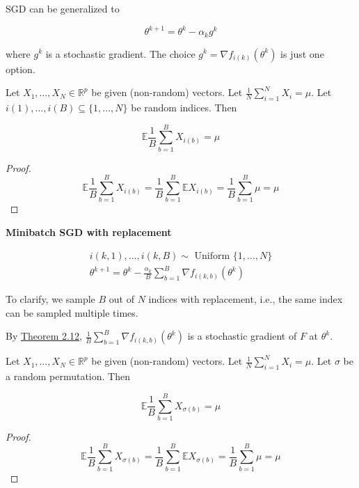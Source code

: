 \documentclass{report}
\begin{document}
SGD can be generalized to

$$
\theta^{k+1}=\theta^{k}-\alpha_{k} g^{k}
$$

where $g^{k}$ is a stochastic gradient. The choice $g^{k}=\nabla f_{i(k)}\left(\theta^{k}\right)$ is just one option.

\begin{theorem}
    Let $X_{1}, \ldots, X_{N} \in \mathbb{R}^{p}$ be given (non-random) vectors. Let $\frac{1}{N} \sum_{i=1}^{N} X_{i}=\mu$. Let $i(1), \ldots, i(B) \subseteq\{1, \ldots, N\}$ be random indices. Then

    $$
    \mathbb{E} \frac{1}{B} \sum_{b=1}^{B} X_{i(b)}=\mu
    $$

    \begin{proof}
        $$
        \mathbb{E} \frac{1}{B} \sum_{b=1}^{B} X_{i(b)}=\frac{1}{B} \sum_{b=1}^{B} \mathbb{E} X_{i(b)}=\frac{1}{B} \sum_{b=1}^{B} \mu=\mu
        $$
    \end{proof}
\end{theorem}

\begin{definition}
    \textbf{Minibatch SGD with replacement}

    $$
    \begin{gathered}
    i(k, 1), \ldots, i(k, B) \sim \text { Uniform }\{1, \ldots, N\} \\
    \theta^{k+1}=\theta^{k}-\frac{\alpha_{k}}{B} \sum_{b=1}^{B} \nabla f_{i(k, b)}\left(\theta^{k}\right)
    \end{gathered}
    $$

    To clarify, we sample $B$ out of $N$ indices with replacement, i.e., the same index can be sampled multiple times.

    By \hyperref[theorem:2.12]{Theorem 2.12}, $\frac{1}{B} \sum_{b=1}^{B} \nabla f_{i(k, b)}\left(\theta^{k}\right)$ is a stochastic gradient of $F$ at $\theta^{k}$.
\end{definition}

\begin{theorem}
    Let $X_{1}, \ldots, X_{N} \in \mathbb{R}^{p}$ be given (non-random) vectors. Let $\frac{1}{N} \sum_{i=1}^{N} X_{i}=\mu$. Let $\sigma$ be a random permutation. Then

    $$
    \mathbb{E} \frac{1}{B} \sum_{b=1}^{B} X_{\sigma(b)}=\mu
    $$

    \begin{proof}
        $$
        \mathbb{E} \frac{1}{B} \sum_{b=1}^{B} X_{\sigma(b)}=\frac{1}{B} \sum_{b=1}^{B} \mathbb{E} X_{\sigma(b)}=\frac{1}{B} \sum_{b=1}^{B} \mu=\mu
        $$
    \end{proof}
\end{theorem}
\end{document}
